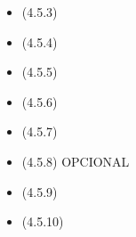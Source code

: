 \documentclass{article}
\begin{document}
\begin{itemize}
\begin{itemize}
		\end{itemize}
	\item (4.5.3)
	\item (4.5.4)
	\item (4.5.5)
			\item (4.5.6)
			\item (4.5.7)
			\item (4.5.8) OPCIONAL
			\item (4.5.9)
			\item (4.5.10)
		\end{itemize}

	
\end{document}
